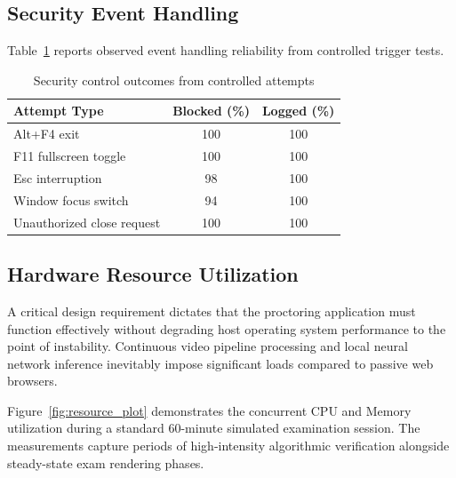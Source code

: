 \documentclass[conference]{IEEEtran}
\begin{document}
\subsection{Security Event Handling}
Table~\ref{tab:security} reports observed event handling reliability from controlled trigger tests.

\begin{table}[h]
\caption{Security control outcomes from controlled attempts}
\label{tab:security}
\centering
\begin{tabular}{p{2.55cm}cc}
\toprule
\textbf{Attempt Type} & \textbf{Blocked (\%)} & \textbf{Logged (\%)} \\
\midrule
Alt+F4 exit & 100 & 100 \\
F11 fullscreen toggle & 100 & 100 \\
Esc interruption & 98 & 100 \\
Window focus switch & 94 & 100 \\
Unauthorized close request & 100 & 100 \\
\bottomrule
\end{tabular}
\end{table}

\subsection{Hardware Resource Utilization}
A critical design requirement dictates that the proctoring application must function effectively without degrading host operating system performance to the point of instability. Continuous video pipeline processing and local neural network inference inevitably impose significant loads compared to passive web browsers. 

Figure~\ref{fig:resource_plot} demonstrates the concurrent CPU and Memory utilization during a standard 60-minute simulated examination session. The measurements capture periods of high-intensity algorithmic verification alongside steady-state exam rendering phases.
\end{document}
